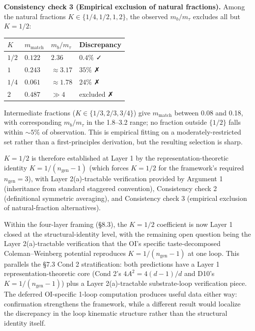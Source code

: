 \documentclass[
]{article}
\begin{document}
\textbf{Consistency check 3 (Empirical exclusion of natural fractions).}
Among the natural fractions \(K \in \{1/4, 1/2, 1, 2\}\), the observed
\(m_b/m_\tau\) excludes all but \(K = 1/2\):

\begin{longtable}[]{@{}llll@{}}
\toprule\noalign{}
\(K\) & \(m_{\text{match}}\) & \(m_b/m_\tau\) & Discrepancy \\
\midrule\noalign{}
\endhead
\bottomrule\noalign{}
\endlastfoot
\(1/2\) & \(0.122\) & \(2.36\) & \(0.4\%\) ✓ \\
\(1\) & \(0.243\) & \(\approx 3.17\) & \(35\%\) ✗ \\
\(1/4\) & \(0.061\) & \(\approx 1.78\) & \(24\%\) ✗ \\
\(2\) & \(0.487\) & \(\gg 4\) & excluded ✗ \\
\end{longtable}

Intermediate fractions (\(K \in \{1/3, 2/3, 3/4\}\)) give
\(m_{\text{match}}\) between 0.08 and 0.18, with corresponding
\(m_b/m_\tau\) in the 1.8--3.2 range; no fraction outside \(\{1/2\}\)
falls within \(\sim 5\%\) of observation. This is empirical fitting on a
moderately-restricted set rather than a first-principles derivation, but
the resulting selection is sharp.

\(K = 1/2\) is therefore established at Layer 1 by the
representation-theoretic identity \(K = 1/(n_{\text{gen}} - 1)\) (which
forces \(K = 1/2\) for the framework's required \(n_{\text{gen}} = 3\)),
with Layer 2(a)-tractable verification provided by Argument 1
(inheritance from standard staggered convention), Consistency check 2
(definitional symmetric averaging), and Consistency check 3 (empirical
exclusion of natural-fraction alternatives).

Within the four-layer framing (§8.3), the \(K = 1/2\) coefficient is now
Layer 1 closed at the structural-identity level, with the remaining open
question being the Layer 2(a)-tractable verification that the OI's
specific taste-decomposed Coleman--Weinberg potential reproduces
\(K = 1/(n_{\text{gen}} - 1)\) at one loop. This parallels the §7.3 Cond
2 stratification: both predictions have a Layer 1
representation-theoretic core (Cond 2's \(4A^2 = 4(d-1)/d\) and D10's
\(K = 1/(n_{\text{gen}} - 1)\)) plus a Layer 2(a)-tractable
substrate-loop verification piece. The deferred OI-specific 1-loop
computation produces useful data either way: confirmation strengthens
the framework, while a different result would localize the discrepancy
in the loop kinematic structure rather than the structural identity
itself.
\end{document}
